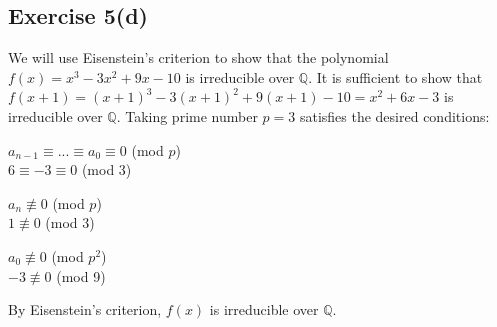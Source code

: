 \subsection*{Exercise 5(d)}
We will use Eisenstein's criterion to show that the polynomial $f(x) = x^3 - 3x^2 + 9x - 10$ is irreducible over $\mathbb{Q}$. It is sufficient to show that $f(x+1) = (x+1)^3 - 3(x+1)^2 + 9(x+1) - 10 = x^2 + 6x - 3$ is irreducible over $\mathbb{Q}$. Taking prime number $p=3$ satisfies the desired conditions:

$a_{n-1} \equiv ... \equiv a_0 \equiv 0$ (mod $p$) \\
$6 \equiv -3 \equiv 0$ (mod $3$)

$a_n \not\equiv 0$ (mod $p$) \\
$1 \not\equiv 0$ (mod 3)

$a_0 \not\equiv 0$ (mod $p^2$) \\
$-3 \not\equiv 0$ (mod 9)

By Eisenstein's criterion, $f(x)$ is irreducible over $\mathbb{Q}$.